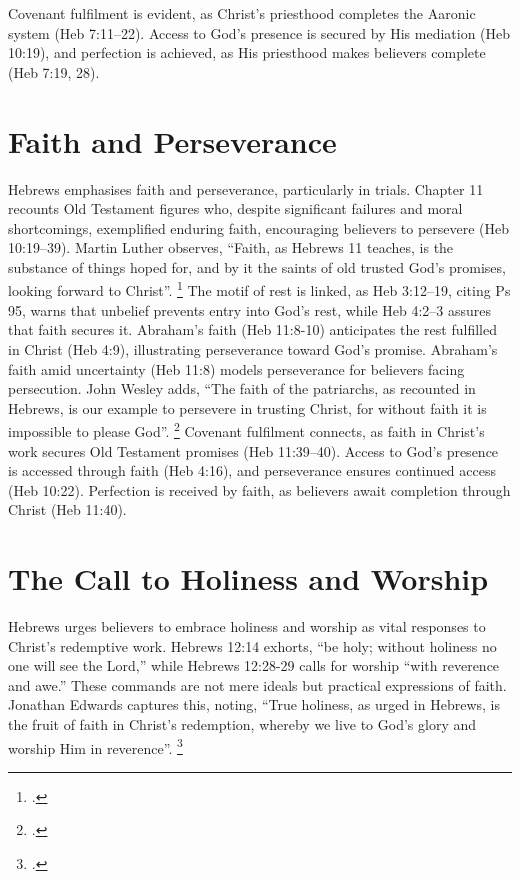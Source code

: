 \documentclass[12pt]{article}
\begin{document}
Covenant fulfilment is evident, as Christ’s priesthood completes the Aaronic
system (Heb 7:11--22). Access to God’s presence is secured by His mediation (Heb
10:19), and perfection is achieved, as His priesthood makes believers complete
(Heb 7:19, 28).

\section{Faith and Perseverance}
Hebrews emphasises faith and perseverance, particularly in trials.
%
Chapter 11 recounts Old Testament figures who, despite significant failures and
moral shortcomings, exemplified enduring faith, encouraging believers to
persevere (Heb 10:19--39).
%
Martin Luther observes, ``Faith, as Hebrews 11 teaches, is the substance of
things hoped for, and by it the saints of old trusted God’s promises, looking
forward to Christ''. \footcite[26]{Luther1968}
%
The motif of rest is linked, as Heb 3:12--19, citing Ps 95, warns that unbelief
prevents entry into God’s rest, while Heb 4:2--3 assures that faith secures it.
Abraham’s faith (Heb 11:8-10) anticipates the rest fulfilled in Christ (Heb
4:9), illustrating perseverance toward God’s promise.
%
Abraham’s faith amid uncertainty (Heb 11:8) models perseverance for believers
facing persecution.
%
John Wesley adds, ``The faith of the patriarchs, as recounted in Hebrews, is our
example to persevere in trusting Christ, for without faith it is impossible to
please God''. \footcite[Heb 11:6]{Wesley1755}
%
Covenant fulfilment connects, as faith in Christ’s work secures Old Testament
promises (Heb 11:39--40).
%
Access to God’s presence is accessed through faith (Heb 4:16), and perseverance
ensures continued access (Heb 10:22).
%
Perfection is received by faith, as believers await completion through Christ
(Heb 11:40).

\section{The Call to Holiness and Worship}
Hebrews urges believers to embrace holiness and worship as vital responses to
Christ’s redemptive work.
%
Hebrews 12:14 exhorts, ``be holy; without holiness no one will see the Lord,''
while Hebrews 12:28-29 calls for worship ``with reverence and awe.''
%
These commands are not mere ideals but practical expressions of faith.
%
Jonathan Edwards captures this, noting, ``True holiness, as urged in Hebrews, is
the fruit of faith in Christ’s redemption, whereby we live to God’s glory and
worship Him in reverence''. \footcite[2.3]{Edwards1959}
\end{document}

